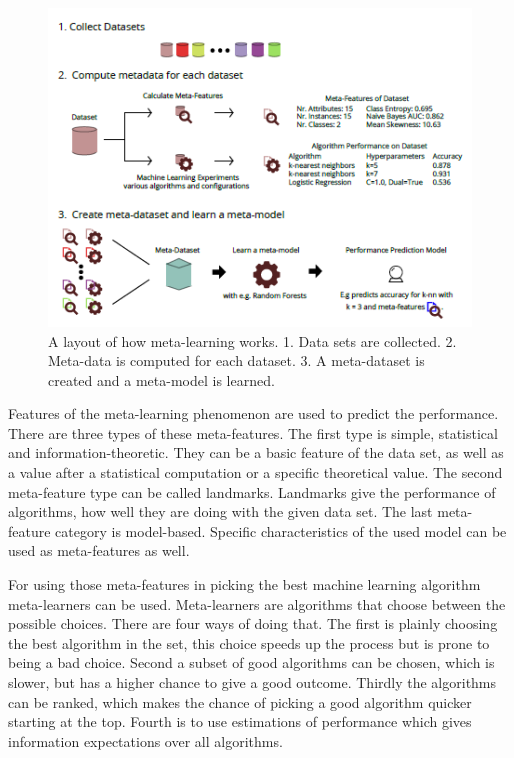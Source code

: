 \documentclass[10pt,a4paper]{article}
\begin{document}
\begin{figure}
	\label{fig:Meta-LearningLayout}
	\includegraphics[scale=1]{Meta-LearningLayout.png}
	\caption{A layout of how meta-learning works. 1. Data sets are collected. 2. Meta-data is computed for each dataset. 3. A meta-dataset is created and a meta-model is learned\cite{Gijsbers2017Thesis}.}
\end{figure}

Features of the meta-learning phenomenon are used to predict the performance. There are three types of these meta-features. The first type is simple, statistical and information-theoretic. They can be a basic feature of the data set, as well as a value after a statistical computation or a specific theoretical value. The second meta-feature type can be called landmarks. Landmarks give the performance of algorithms, how well they are doing with the given data set. The last meta-feature category is model-based. Specific characteristics of the used model can be used as meta-features as well\cite{brazdil1994characterizing, vilalta2004using}.

For using those meta-features in picking the best machine learning algorithm meta-learners can be used. Meta-learners are algorithms that choose between the possible choices. There are four ways of doing that. The first is plainly choosing the best algorithm in the set, this choice speeds up the process but is prone to being a bad choice. Second a subset of good algorithms can be chosen, which is slower, but has a higher chance to give a good outcome. Thirdly the algorithms can be ranked, which makes the chance of picking a good algorithm quicker starting at the top. Fourth is to use estimations of performance which gives information expectations over all algorithms\cite{brazdil2009development}.
	
\end{document}
